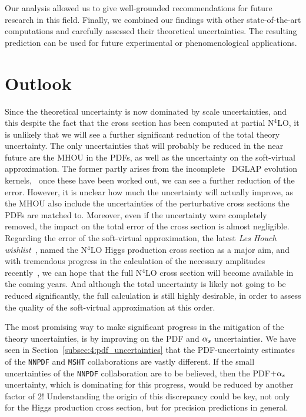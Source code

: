 Our analysis allowed us to give well-grounded recommendations for future research in this field. Finally, we combined our findings with other state-of-the-art computations and carefully assessed their theoretical uncertainties. The resulting prediction can be used for future experimental or phenomenological applications.

\section{Outlook}
Since the theoretical uncertainty is now dominated by scale uncertainties, and this despite the fact that the cross section has been computed at partial N${}^4$LO, it is unlikely that we will see a further significant reduction of the total theory uncertainty. The only uncertainties that will probably be reduced in the near future are the \acs{MHOU} in the \acs{PDF}s, as well as the uncertainty on the soft-virtual approximation. The former partly arises from the incomplete \NNNLO\ DGLAP evolution kernels, \ie\ once these have been worked out, we can see a further reduction of the error. However, it is unclear how much the uncertainty will actually improve, as the \acs{MHOU} also include the uncertainties of the perturbative cross sections the \acs{PDF}s are matched to. Moreover, even if the uncertainty were completely removed, the impact on the total error of the cross section is almost negligible. Regarding the error of the soft-virtual approximation, the latest \textit{Les Houch wishlist}~\cite{Huss:2025nlt}, named the N${}^4$LO Higgs production cross section as a major aim, and with tremendous progress in the calculation of the necessary amplitudes recently~\cite{Chen:2025utl, mistlberger2025rvvtimesvinterferencecontributionsinclusive}, we can hope that the full N${}^4$LO cross section will become available in the coming years. And although the total uncertainty is likely not going to be reduced significantly, the full calculation is still highly desirable, in order to assess the quality of the soft-virtual approximation at this order.

The most promising way to make significant progress in the mitigation of the theory uncertainties, is by improving on the \acs{PDF} and $\alpha_s$ uncertainties. We have seen in Section~\ref{subsec:4:pdf_uncertainties} that the \acs{PDF}-uncertainty estimates of the \texttt{NNPDF} and \texttt{MSHT} collaborations are vastly different. If the small uncertainties of the \texttt{NNPDF} collaboration are to be believed, then the \acs{PDF}$ + \alpha_s$ uncertainty, which is dominating for this progress, would be reduced by another factor of 2! Understanding the origin of this discrepancy could be key, not only for the Higgs production cross section, but for precision predictions in general.

